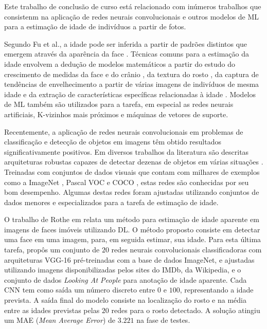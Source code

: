 Este trabalho de conclusão de curso está relacionado com inúmeros trabalhos que consistenm na aplicação de redes neurais convolucionais e outros modelos de ML para a estimação de idade de indivíduos a partir de fotos.

Segundo Fu et al., a idade pode ser inferida a partir de padrões distintos que emergem através da aparência da face \cite{fu2010age}. Técnicas comuns para a estimação da idade envolvem a dedução de modelos matemáticos a partir do estudo do crescimento de medidas da face e do crânio \cite{kwon1999age}, da textura do rosto \cite{lanitis2002toward}, da captura de tendências de envelhecimento a partir de várias imagens de indivíduos de mesma idade \cite{fu2007estimating} e da extração de características específicas relacionadas à idade \cite{suo2008design, lou2018expression}. Modelos de ML também são utilizados para a tarefa, em especial as redes neurais artificiais, K-vizinhos mais próximos e máquinas de vetores de suporte.

Recentemente, a aplicação de redes neurais convolucionais em problemas de classificação e detecção de objetos em imagens têm obtido resultados significativamente positivos. Em  diversos trabalhos da literatura são descritas arquiteturas robustas capazes de detectar dezenas de objetos em várias situações \cite{vggnet, resnet, inception, redmon2016you, ssd}. Treinadas com conjuntos de dados visuais que contam com milhares de exemplos como a ImageNet \cite{ImagenetChall}, Pascal VOC \cite{pascalvoc} e COCO \cite{coco}, estas redes são conhecidas por seu bom desempenho. Algumas destas redes foram ajustadas utilizando conjuntos de dados menores e especializados para a tarefa de estimação de idade.

O trabalho de Rothe em \cite{rothe2015dex} relata um método para estimação de idade aparente em imagens de faces imóveis utilizando DL. O método proposto consiste em detectar uma face em uma imagem, para, em seguida estimar, sua idade. Para esta última tarefa, propôs um conjunto de $20$ redes neurais convolucionais classificadoras com arquiteturas VGG-16 pré-treinadas com a base de dados ImageNet, e ajustadas utilizando imagens disponibilizadas pelos sites do IMDb, da Wikipedia, e o conjunto de dados \emph{Looking At People} para anotação de idade aparente. Cada CNN tem como saída um número discreto entre $0$ e $100$, representando a idade prevista. A saída final do modelo consiste na localização do rosto e na média entre as idades previstas pelas $20$ redes para o rosto detectado. A solução atingiu um MAE (\emph{Mean Average Error}) de $3.221$ na fase de testes.

